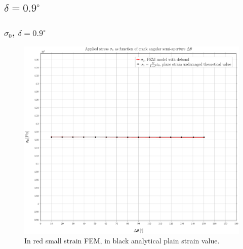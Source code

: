 \documentclass[first,firstsupp,lastsupp,handout,last,hyperref,table]{ETHclass}
\begin{document}

\subsection{$\delta=0.9^{\circ}$}

\begin{frame}
\frametitle{\small $\sigma_{0}$, $\delta=0.9^{\circ}$}
\vspace{-0.5cm}
\centering
\captionsetup[figure]{font=scriptsize,labelfont=scriptsize}
\begin{figure}[!h]
\centering
\includegraphics[height=0.7\textheight]{2017-07-10_AbqRunSummary_SmallStrainD09_sigma-inf_Summary.pdf}
  \caption{\scriptsize In red small strain FEM, in black analytical plain strain value.}
  \label{fig:res1}
\end{figure}
\end{frame}
\end{document}
